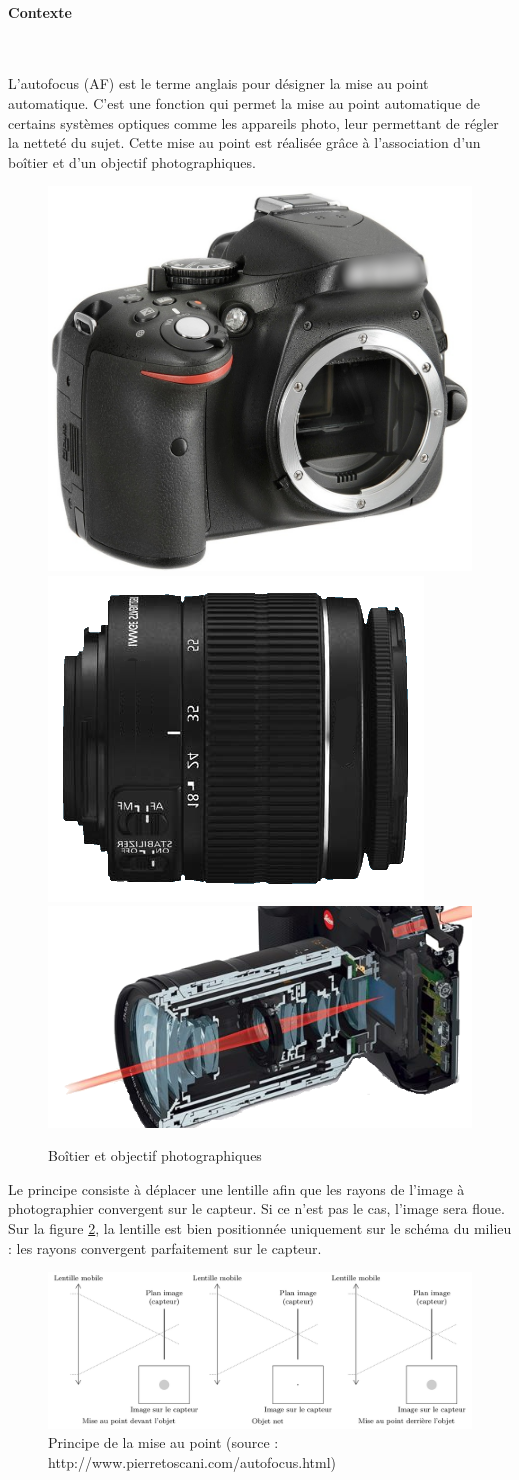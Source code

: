 

\paragraph{Contexte} ~\

L'autofocus (AF) est le terme anglais pour désigner la mise au point automatique. C'est une fonction qui permet la mise au point automatique de certains systèmes optiques comme les appareils photo, leur permettant
de régler la netteté du sujet. Cette mise au point est réalisée grâce à l'association d'un boîtier et d'un objectif photographiques.

\begin{figure}[!h]
\centering\includegraphics[width=0.3\linewidth]{img/figure_01_1}
\includegraphics[width=0.3\linewidth]{img/figure_01_2}
\includegraphics[width=0.3\linewidth]{img/figure_01_3}
 \caption{Boîtier et objectif photographiques}
 \label{img01}
\end{figure}

Le principe consiste à déplacer une lentille afin que les rayons de l'image à photographier convergent sur le capteur. Si ce n'est pas le cas, l'image sera floue. Sur la figure \ref{img02}, la lentille est bien positionnée uniquement sur le schéma du milieu : les rayons convergent parfaitement sur le capteur.

\begin{figure}[!h]
\centering\includegraphics[width=0.9\linewidth]{img/figure_02}
 \caption{Principe de la mise au point (source : http://www.pierretoscani.com/autofocus.html)}
 \label{img02}
\end{figure}

